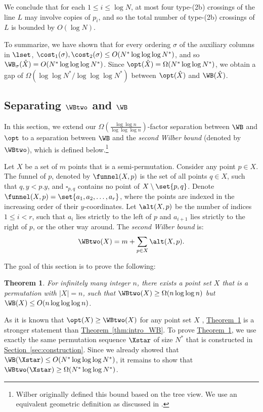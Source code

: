 \documentclass[11pt]{article}
\numberwithin{equation}{section}
\newtheorem{theorem}{Theorem}[section]
\theoremstyle{definition}
\theoremstyle{plain}
\newcommand{\expref}[2]{\hyperref[#2]{#1~\ref{#2}}}
\begin{document}
We conclude that for each $1\leq i\leq \log N$, at most four type-(2b) crossings of the line $L$ may involve copies of $p_i$, and so the total number of type-(2b) crossings of $L$ is bounded by $O(\log N)$.


To summarize, we have shown that for every ordering $\sigma$ of the auxiliary columns in $\lset$, $\cost_1(\sigma),\cost_2(\sigma)\leq O(N^*\log\log\log N^*)$, and so $\WB_{\sigma}(\hat X)=O(N^*\log\log\log N^*)$. Since $\opt(\hat X)=\Omega(N^*\log\log N^*)$, we obtain a gap of $\Omega(\log\log N^*/\log\log\log N^*)$ between $\opt(\hat X)$ and $\WB(\hat X)$.

\subsection{Separating $\WBtwo$ and $\WB$}
\label{subsec: separating two wilbers}

In this section, we extend our $\Omega(\frac{\log\log n}{\log\log\log n})$-factor
separation between $\WB$ and $\opt$ to a separation between $\WB$
and the \emph{second Wilber bound} (denoted by $\WBtwo$), which is defined below.\footnote{Wilber originally defined this bound based on the tree view. We use an equivalent geometric definition as discussed in \cite{DHIKP09,in_pursuit}.}


Let $X$ be a set of $m$ points that is a semi-permutation. Consider any point $p\in X$. The funnel of $p$, denoted by $\funnel(X,p)$ is the set of all points $q\in X$, such that $q,y<p.y$, and $\square_{p,q}$ contains no point of $X\setminus\set{p,q}$. 
Denote $\funnel(X,p)=\set{a_1,a_2,\ldots,a_r}$, where the points are indexed in the increasing order of their $y$-coordinates. Let $\alt(X,p)$ be the number of indices $1\leq i<r$, such that $a_i$ lies strictly to the left of $p$ and $a_{i+1}$ lies strictly to the right of $p$, or the other way around. The
\emph{second Wilber bound } is:
\[
\WBtwo(X)=m+\sum_{p\in X}\alt(X,p).
\]


The goal of this section is to prove the following:
\begin{theorem}
\label{thm:sep WBtwo}For infinitely many integer $n$, there exists a point set $X$ that is a permutation with $|X|=n$, such that $\WBtwo(X)\ge\Omega(n\log\log n)$ but $\WB(X)\le O(n\log\log\log n)$.
\end{theorem}

As it is known that $\opt(X)\ge\WBtwo(X)$ for any point set $X$ \cite{wilber},
\expref{Theorem}{thm:sep WBtwo} is a stronger statement than \expref{Theorem}{thm:intro_WB}.
To prove \expref{Theorem}{thm:sep WBtwo}, we use exactly the same permutation
sequence $\Xstar$ of size $N^{*}$ that is constructed in \expref{Section}{sec:construction}. Since we already showed that  $\WB(\Xstar)\le O(N^{*}\log\log\log N^{*})$, 
it remains to show that $\WBtwo(\Xstar)\ge\Omega(N^{*}\log\log N^{*})$.
\end{document}
